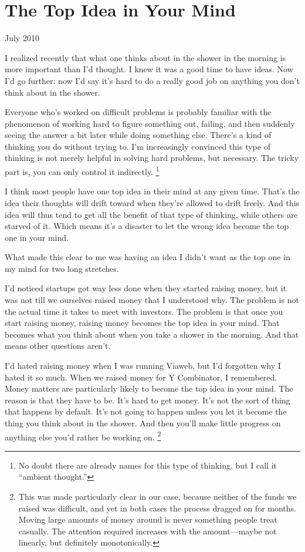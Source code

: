 \chapter{The Top Idea in Your Mind }

July 2010

I realized recently that what one thinks about in the shower in the
morning is more important than I'd thought. I knew it was a good time to
have ideas. Now I'd go further: now I'd say it's hard to do a really
good job on anything you don't think about in the shower.

Everyone who's worked on difficult problems is probably familiar with
the phenomenon of working hard to figure something out, failing, and
then suddenly seeing the answer a bit later while doing something else.
There's a kind of thinking you do without trying to. I'm increasingly
convinced this type of thinking is not merely helpful in solving hard
problems, but necessary. The tricky part is, you can only control it
indirectly. \footnote{No doubt there are already names for this type of thinking, but
I call it ``ambient thought.''}

I think most people have one top idea in their mind at any given time.
That's the idea their thoughts will drift toward when they're allowed to
drift freely. And this idea will thus tend to get all the benefit of
that type of thinking, while others are starved of it. Which means it's
a disaster to let the wrong idea become the top one in your mind.

What made this clear to me was having an idea I didn't want as the top
one in my mind for two long stretches.

I'd noticed startups got way less done when they started raising money,
but it was not till we ourselves raised money that I understood why. The
problem is not the actual time it takes to meet with investors. The
problem is that once you start raising money, raising money becomes the
top idea in your mind. That becomes what you think about when you take a
shower in the morning. And that means other questions aren't.

I'd hated raising money when I was running Viaweb, but I'd forgotten why
I hated it so much. When we raised money for Y Combinator, I remembered.
Money matters are particularly likely to become the top idea in your
mind. The reason is that they have to be. It's hard to get money. It's
not the sort of thing that happens by default. It's not going to happen
unless you let it become the thing you think about in the shower. And
then you'll make little progress on anything else you'd rather be
working on. \footnote{This was made particularly clear in our case, because neither of
the funds we raised was difficult, and yet in both cases the process
dragged on for months. Moving large amounts of money around is never
something people treat casually. The attention required increases with
the amount---maybe not linearly, but definitely monotonically.}

